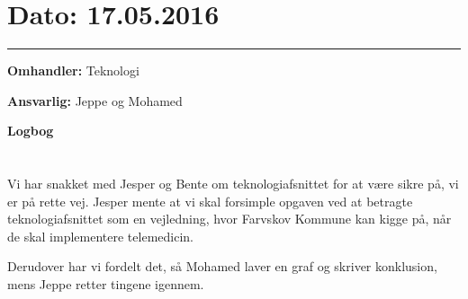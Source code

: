 
\section{Dato: 17.05.2016}
\hrule

\textbf{Omhandler:} Teknologi

\textbf{Ansvarlig:} Jeppe og Mohamed

\textbf{Logbog}
\\
\\ \\
Vi har snakket med Jesper og Bente om teknologiafsnittet for at være sikre på, vi er på rette vej. 
  Jesper mente at vi skal forsimple opgaven ved at 
  betragte teknologiafsnittet som en vejledning, hvor 
  Farvskov Kommune kan kigge på, når de skal
  implementere telemedicin. 
  
Derudover har vi fordelt det, så Mohamed laver en graf og skriver konklusion, mens Jeppe retter tingene igennem.



